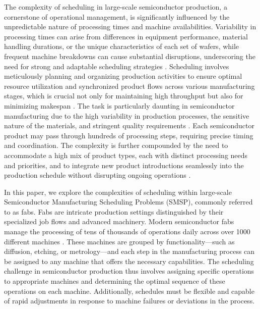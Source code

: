 The complexity of scheduling in large-scale semiconductor production, a cornerstone of operational management, is significantly influenced by the unpredictable nature of processing times and machine availabilities. Variability in processing times can arise from differences in equipment performance, material handling durations, or the unique characteristics of each set of wafers, while frequent machine breakdowns can cause substantial disruptions, underscoring the need for strong and adaptable scheduling strategies \cite{leachman1996benchmarking}. Scheduling involves meticulously planning and organizing production activities to ensure optimal resource utilization and synchronized product flows across various manufacturing stages, which is crucial not only for maintaining high throughput but also for minimizing makespan \cite{schumann2022scheduling}. The task is particularly daunting in semiconductor manufacturing due to the high variability in production processes, the sensitive nature of the materials, and stringent quality requirements \cite{May2006}. Each semiconductor product may pass through hundreds of processing steps, requiring precise timing and coordination. The complexity is further compounded by the need to accommodate a high mix of product types, each with distinct processing needs and priorities, and to integrate new product introductions seamlessly into the production schedule without disrupting ongoing operations \cite{Mönch2011}.

In this paper, we explore the complexities of scheduling within large-scale Semiconductor Manufacturing Scheduling Problems (SMSP), commonly referred to as fabs. Fabs are intricate production settings distinguished by their specialized job flows and advanced machinery. Modern semiconductor fabs manage the processing of tens of thousands of operations daily across over 1000 different machines \cite{kopp2020smt2020}. These machines are grouped by functionality—such as diffusion, etching, or metrology—and each step in the manufacturing process can be assigned to any machine that offers the necessary capabilities. The scheduling challenge in semiconductor production thus involves assigning specific operations to appropriate machines and determining the optimal sequence of these operations on each machine. Additionally, schedules must be flexible and capable of rapid adjustments in response to machine failures or deviations in the process.

